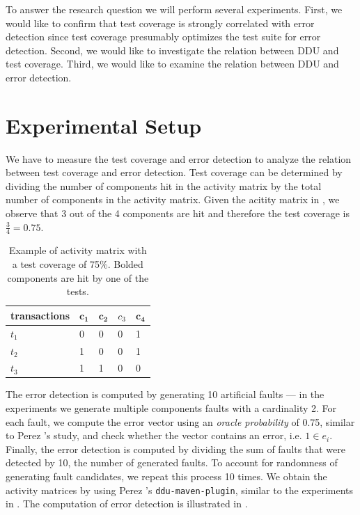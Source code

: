\documentclass[twoside,a4paper,11pt]{memoir}
\begin{document}
To answer the research question we will perform several experiments.
First, we would like to confirm that test coverage is strongly correlated with error detection since test coverage presumably optimizes the test suite for error detection.
Second, we would like to investigate the relation between DDU and test coverage.
Third, we would like to examine the relation between DDU and error detection.


\section{Experimental Setup}
We have to measure the test coverage and error detection to analyze the relation between test coverage and error detection.
Test coverage can be determined by dividing the number of components hit in the activity matrix by the total number of components in the activity matrix.
Given the acitity matrix in , we observe that 3 out of the 4 components are hit and therefore the test coverage is \(\frac{3}{4} = 0.75 \).
\begin{table}[]
\centering
\caption{Example of activity matrix with a test coverage of 75\%. Bolded components are hit by one of the tests.}%
\label{tab:test_coverage}
\begin{tabular}{l|llll}
transactions & \(\mathbf{c_1} \) & \(\mathbf{c_2} \) & \(c_3 \) & \(\mathbf{c_4} \) \\ \hline
\(t_1 \) & 0 & 0 & 0 & 1 \\
\(t_2 \) & 1 & 0 & 0 & 1 \\
\(t_3 \) & 1 & 1 & 0 & 0
\end{tabular}
\end{table}
The error detection is computed by generating 10 artificial faults --- in the experiments we generate multiple components faults with a cardinality 2.
For each fault, we compute the error vector using an \emph{oracle probability} of 0.75, similar to Perez \etal's study, and check whether the vector contains an error, i.e. \(1 \in e_i \).
Finally, the error detection is computed by dividing the sum of faults that were detected by 10, the number of generated faults.
To account for randomness of generating fault candidates, we repeat this process 10 times.
We obtain the activity matrices by using Perez \etal's \texttt{ddu-maven-plugin}, similar to the experiments in .
The computation of error detection is illustrated in .
\end{document}
